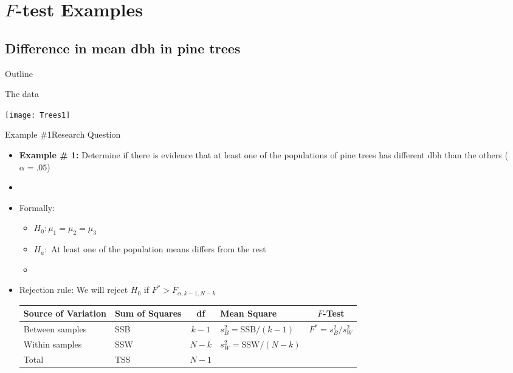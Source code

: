 \documentclass[xcolor=dvipsnames]{beamer}
\begin{document}
\section{$F$-test Examples}
\subsection{Difference in mean dbh in pine trees}

\begin{frame}{Outline}
	\tableofcontents[currentsection,subsectionstyle=show/shaded/hide]
\end{frame}

\begin{frame}{The data}
	\begin{center}
		\texttt{[image: Trees1]}
	\end{center}
\end{frame}

\begin{frame}{Example \#1}{Research Question}
	\begin{itemize}
		\item \textbf{Example \# 1:} Determine if there is evidence that at least one of the populations of pine trees has different dbh than the others ($\alpha = .05$) \pause
		\item[]
		\item Formally:
		\begin{itemize}
			\item $H_0: \mu_1 = \mu_2 = \mu_3$
			\item $H_a:$ At least one of the population means differs from the rest
			\item[]
		\end{itemize} \pause
		\item Rejection rule: We will reject $H_0$ if $F^* > F_{\alpha, k-1, N-k}$ \pause
			\vspace{2mm}
		\begin{center}
			{\scriptsize
				\begin{tabular}{lp{1.2cm}cp{2.5cm}c}
					\hline 
					\textbf{Source of Variation} & \textbf{Sum of Squares} & \textbf{df} & \textbf{Mean Square} & $F$-\textbf{Test} \\ \hline 
					Between samples & SSB & $k - 1$ & $s_B^2 = \text{SSB} / (k-1)$ & $F^* = s_B^2 / s_W^2$ \\
					Within samples & SSW & $N - k$ &  $s_W^2 = \text{SSW} / (N-k)$ & \\
					Total & TSS & $N-1$ & & \\ \hline
			\end{tabular}}
		\end{center}
	\end{itemize}
\end{frame}
\end{document}
